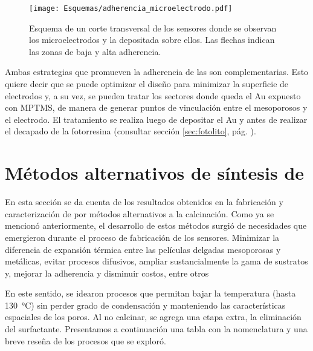 				\begin{figure}[!ht]
					\begin{center}
					\texttt{[image: Esquemas/adherencia\_microelectrodo.pdf]}
					\caption[Adherencia a los microelectrodos.]{Esquema de un corte transversal de los sensores donde se observan los microelectrodos y la \pdm\space depositada sobre ellos. Las flechas indican las zonas de baja y alta adherencia.}
					\label{fig:adherencia_microelectrodo}
					\end{center}
					\end{figure}
			
			Ambas estrategias que promueven la adherencia de las \pdm\space son complementarias. Esto quiere decir que se puede optimizar el diseño para minimizar la superficie de electrodos y, a su vez, se pueden tratar los sectores donde queda el Au expuesto con MPTMS, de manera de generar puntos de vinculación entre el mesoporosos y el electrodo. El tratamiento se realiza luego de depositar el Au y antes de realizar el decapado de la fotorresina (consultar sección \ref{sec:fotolito}, pág. \pageref{sec:fotolito}).		

\section{Métodos alternativos de síntesis de \pdm}
	
	 En esta sección se da cuenta de los resultados obtenidos en la fabricación y caracterización de \pdm\space por métodos alternativos a la calcinación. Como ya se mencionó anteriormente, el desarrollo de estos métodos surgió de necesidades que emergieron durante el proceso de fabricación de los sensores. Minimizar la diferencia de expansión térmica entre las películas delgadas mesoporosas y metálicas, evitar procesos difusivos, ampliar sustancialmente la gama de sustratos y, mejorar la adherencia y disminuir costos, entre otros

	 En este sentido, se idearon procesos que permitan bajar la temperatura (hasta \SI{130}{\celsius}) sin perder grado de condensación y manteniendo las características espaciales de los poros. Al no calcinar, se agrega una etapa extra, la eliminación del surfactante. Presentamos a continuación una tabla con la nomenclatura y una breve reseña de los procesos que se exploró.

